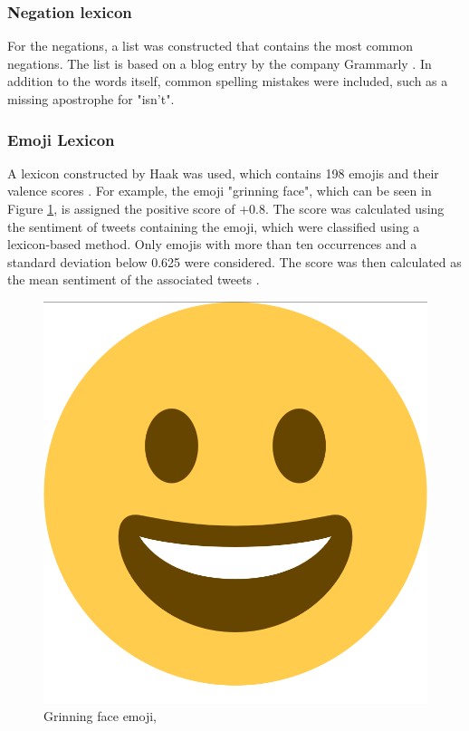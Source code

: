 \subsubsection{Negation lexicon}
For the negations, a list was constructed that contains the most common negations. The list is based on a blog entry by the company Grammarly \cite{negations}. In addition to the words itself, common spelling mistakes were included, such as a missing apostrophe for "isn't".

\subsubsection{Emoji Lexicon}
A lexicon constructed by Haak was used, which contains 198 emojis and their valence scores \cite{haak_dataset}. For example, the emoji "grinning face", which can be seen in Figure \ref{fig:emoji}, is assigned the positive score of +0.8. The score was calculated using the sentiment of tweets containing the emoji, which were classified using a lexicon-based method. Only emojis with more than ten occurrences and a standard deviation below 0.625 were considered. The score was then calculated as the mean sentiment of the associated tweets \cite{haak_article}.

\begin{figure}
    \centering
    \includegraphics[scale=0.05]{Images/emoji_smile.png}
    \caption{Grinning face emoji, }
    \label{fig:emoji}
\end{figure}



